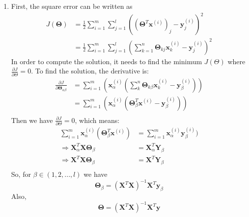 \documentclass[a4paper]{article}
\begin{document}
\begin{enumerate}
\item First, the square error can be written as 
  \begin{equation*}
    \begin{aligned}
      J(\boldsymbol \Theta) 
      &= \frac{1}{2} \sum_{i = 1}^m \sum_{j = 1}^l (({\boldsymbol \Theta}^T \boldsymbol{x}^{(i)})_j - \boldsymbol{y}_j^{(i)})^2\\
      &= \frac{1}{2} \sum_{i = 1}^m \sum_{j = 1}^l (\sum_{k=1}^n \boldsymbol{\Theta}_{kj} \boldsymbol{x}^{(i)}_k - \boldsymbol{y}_j^{(i)})^2
    \end{aligned}
  \end{equation*}
  In order to compute the solution, it needs to find the minimum $J(\Theta)$ where $\frac{\partial J}{\partial \Theta}=0$. To find the solution, the derivative is:
  \begin{equation*}
    \begin{aligned}
      \frac{\partial J}{\partial \boldsymbol{\Theta}_{\alpha \beta}}
      &= \sum_{i = 1}^m (\boldsymbol{x}_\alpha^{(i)}(\sum_k^n \boldsymbol{\Theta}_{k \beta} \boldsymbol{x}_k^{(i)}-\boldsymbol{y}_{\beta}^{(i)}))\\
      &= \sum_{i = 1}^m (\boldsymbol{x}_\alpha^{(i)}(\boldsymbol{\Theta}_\beta^T \boldsymbol{x}^{(i)}-\boldsymbol{y}_{\beta}^{(i)}))\\
    \end{aligned}
  \end{equation*}
  Then we have $\frac{\partial J}{\partial \Theta}=0$, which means:
  \begin{equation*}
    \begin{aligned}
      \sum_{i = 1}^m \boldsymbol{x}_\alpha^{(i)}(\boldsymbol{\Theta}_\beta^T \boldsymbol{x}^{(i)}) 
      &= \sum_{i = 1}^m \boldsymbol{x}^{(i)}_\alpha \boldsymbol{y}_{\beta}^{(i)})\\
      \Rightarrow \boldsymbol{X}_\alpha^T \boldsymbol{X} \boldsymbol{\Theta}_\beta &= \boldsymbol{X}_\alpha^T \boldsymbol{Y}_{\beta}\\
      \Rightarrow \boldsymbol{X}^T \boldsymbol{X} \boldsymbol{\Theta}_\beta &= \boldsymbol{X}^T \boldsymbol{Y}_{\beta}\\
    \end{aligned}
  \end{equation*}
  So, for $\beta \in (1,2,...,l)$ we have
  \begin{equation*}
    \boldsymbol{\Theta}_\beta = (\boldsymbol{X}^T \boldsymbol{X})^{-1} \boldsymbol{X}^T \boldsymbol{y}_{\beta}
  \end{equation*}
  Also,
  \begin{equation*}
    \boldsymbol{\Theta} = (\boldsymbol{X}^T \boldsymbol{X})^{-1} \boldsymbol{X}^T \boldsymbol{y}
  \end{equation*}



\end{enumerate}
\end{document}
